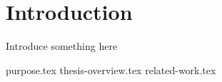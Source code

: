 \documentclass{report}
\begin{document}
\chapter{Introduction}
\label{cha:introduction}





Introduce something here

{purpose.tex}
{thesis-overview.tex}
{related-work.tex}

\end{document}
